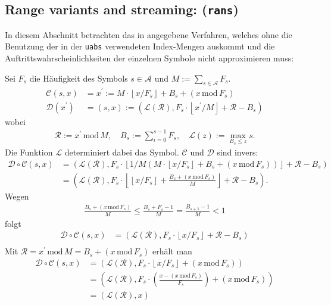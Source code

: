 \documentclass[a4paper,12pt]{article}
\newcommand{\R}{\mathcal R}
\newcommand{\A}{\mathcal A}
\newcommand{\C}{\mathcal C}
\newcommand{\D}{\mathcal D}
\newcommand{\xL}{\mathcal L}
\begin{document}
\subsection{Range variants and streaming: ({\tt{rans}})}
In diesem Abschnitt betrachten das in \cite{Krajcevski} angegebene Verfahren, welches ohne die Benutzung der in der {\tt{uabs}} verwendeten Index-Mengen auskommt und die Auftrittswahrscheinlichkeiten der einzelnen Symbole nicht approximieren muss:
\par
Sei $F_{s}$ die Häufigkeit des Symbols $s\in\A$ und $M:=\sum_{s\in\A}F_{s}$.
\begin{align*}
\C(s,x)&= x^{'} := M \cdot \left\lfloor x / F_{s}  \right\rfloor + B_{s} + \left(x\,\text{mod}\,F_{s}\right)
\\
\D(x^{'}) &=(s, x):=\left(\xL(\R),   F_{s}\cdot\left\lfloor x^{'} / M \right\rfloor    + \R - B_{s}\right)
\end{align*} 
wobei
\begin{align*}
\R := x^{'}\,\text{mod}\,M, \quad B_{s}:=\sum_{i=0}^{s-1} F_{s},
\quad
\xL(z):= \max_{B_{s} \leq z} s .
\end{align*}
Die Funktion $\xL$ determiniert dabei das Symbol.
$\C$ und $\D$ sind invers:
\begin{align*}
\D \circ \C(s, x)&=\left(\xL(\R),F_{s}\cdot \left\lfloor   1 / M \left( 
M\cdot \left\lfloor  x / F_{s}\right\rfloor  + B_{s}   +  \left(x\,\text{mod}\,F_{s}\right)
\right)  \right\rfloor    + \R - B_{s}\right)
\\
&=
\left(\xL(\R),F_{s}\cdot \left\lfloor 
\left\lfloor  x / F_{s}\right\rfloor  + \frac{B_{s}   +  \left(x\,\text{mod}\,F_{s}\right)}{M}
\right\rfloor  + \R - B_{s} \right).
\end{align*}
Wegen 
\begin{align*}
\frac{B_{s}   +  \left(x\,\text{mod}\,F_{s}\right)}{M} \leq \frac{B_{s}   +  F_{s}-1}{M} = \frac{B_{s+1}-1}{M} < 1
\end{align*}
folgt
\begin{align*}
\D \circ \C(s, x)&=
\left(\xL(\R),F_{s}\cdot
\left\lfloor  x / F_{s}\right\rfloor  + \R - B_{s} \right)
\\
\end{align*}
Mit $\R = x^{'}\,\text{mod}\,M = B_{s} + \left(x\,\text{mod}\,F_{s}\right)$
erhält man
\begin{align*}
\D \circ \C(s, x)&=
\left(\xL(\R),F_{s}\cdot
\left\lfloor  x / F_{s}\right\rfloor  + \left(x\,\text{mod}\,F_{s}\right) \right)
\\
&=
\left(\xL(\R),F_{s}\cdot
\left(\frac{x - \left(x\,\text{mod}\,F_{s}\right)}{F_{s}}\right) + \left(x\,\text{mod}\,F_{s}\right) \right)
\\
&=\left(\xL(\R),x\right)
\end{align*}
\end{document}
